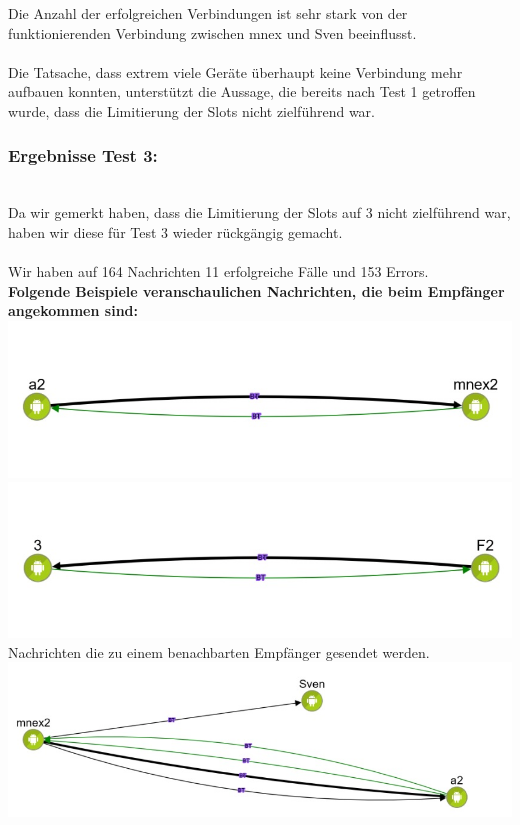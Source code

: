 Die Anzahl der erfolgreichen Verbindungen ist sehr stark von der
funktionierenden Verbindung zwischen mnex und Sven beeinflusst.\\\\

Die Tatsache, dass extrem viele Geräte überhaupt keine Verbindung mehr
aufbauen konnten, unterstützt die Aussage, die bereits nach Test 1
getroffen wurde, dass die Limitierung der Slots nicht zielführend war.
\\
\subsubsection{Ergebnisse Test 3:}\label{ergebnisse-test-3}
\\
Da wir gemerkt haben, dass die Limitierung der Slots auf 3 nicht
zielführend war, haben wir diese für Test 3 wieder rückgängig gemacht.\\\\

Wir haben auf 164 Nachrichten 11 erfolgreiche Fälle und 153 Errors.
\\
\textbf{Folgende Beispiele veranschaulichen Nachrichten, die beim
Empfänger angekommen sind:}\\
\includegraphics[width=1.0\textwidth]{belege/grosstests/Bilder/Grosstest2/Test3Erfolg1.jpg}\\
\includegraphics[width=1.0\textwidth]{belege/grosstests/Bilder/Grosstest2/Test3Erfolg2.jpg}\\
Nachrichten die zu einem benachbarten Empfänger gesendet werden.\\
\includegraphics[width=1.0\textwidth]{belege/grosstests/Bilder/Grosstest2/Test3Erfolg3.jpg}\\


